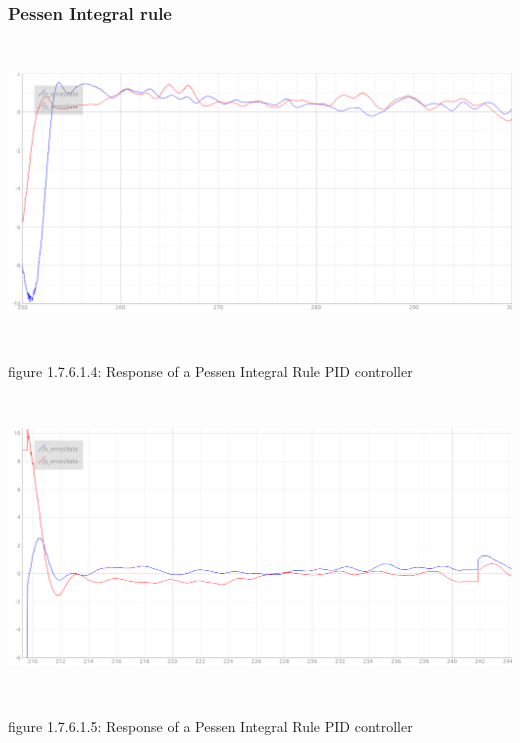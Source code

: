 \documentclass[a4paper,12pt,oneside]{book}
\begin{document}
\subsubsection{Pessen Integral rule}
\begin{flushleft}
\includegraphics[width = 15cm , height= 8cm]{Pessen-rule.png}
\begin{center}
    figure 1.7.6.1.4: Response of a Pessen Integral Rule PID controller
\end{center}
\vspace{1em}
\includegraphics[width = 15cm , height= 8cm]{pessen-rule2.png}
\begin{center}
    figure 1.7.6.1.5: Response of a Pessen Integral Rule PID controller
\end{center}
\end{flushleft}
\end{document}
